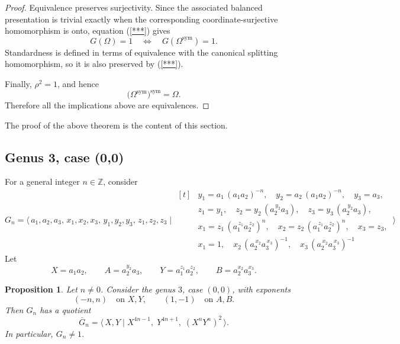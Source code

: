 \documentclass{article}
\newtheorem{prop}[theorem]{Proposition}
\newcommand{\Z}{\mathbb{Z}}
\newcommand{\gp}[2]{\langle\, #1 \mid #2 \,\rangle}
\begin{document}
\begin{proof}
Equivalence preserves surjectivity.  Since the associated balanced
presentation is trivial exactly when the corresponding
coordinate-surjective homomorphism is onto, equation (\ref{***}) gives
\[
   G(\Omega)=1
   \quad\Longleftrightarrow\quad
   G(\Omega^{\mathrm{sym}})=1.
\]
Standardness is defined in terms of equivalence with the canonical
splitting homomorphism, so it is also preserved by (\ref{***}).

Finally, \(\rho^2=1\), and hence
\[
   \bigl(\Omega^{\mathrm{sym}}\bigr)^{\mathrm{sym}}
   =
   \Omega.
\]
Therefore all the implications above are equivalences.
\end{proof}

The proof of the above  theorem is the content of this section.


\subsection{Genus 3, case (0,0)}
For a general integer $n\in\Z$, consider
\[
G_n=\gp{a_1,a_2,a_3,\,x_1,x_2,x_3,\,y_1,y_2,y_3,\,z_1,z_2,z_3}{
\begin{aligned}[t]
&y_1=a_1\,(a_1a_2)^{-n},\quad y_2=a_2\,(a_1a_2)^{-n},\quad y_3=a_3,\\
&z_1=y_1,\quad z_2=y_2\,(a_2^{\,y_2}a_3),\quad z_3=y_3\,(a_2^{\,y_2}a_3),\\
&x_1=z_1\,(a_1^{\,z_1}a_2^{\,z_2})^{n},\quad x_2=z_2\,(a_1^{\,z_1}a_2^{\,z_2})^{n},\quad x_3=z_3,\\
&x_1=1,\quad x_2\,(a_2^{\,x_2}a_3^{\,x_3})^{-1},\quad x_3\,(a_2^{\,x_2}a_3^{\,x_3})^{-1}
\end{aligned}
}
\]
Let
\[
X=a_1a_2,\qquad
 A=a_2^{y_2}a_3,\qquad
Y=a_1^{z_1}a_2^{z_2},\qquad
B=a_2^{x_2}a_3^{x_3}.
\]

\begin{prop}\label{lm:genus3-00-quotient}
Let \(n\neq 0\).  Consider the genus \(3\), case \((0,0)\), with
exponents
\[
(-n,n)\quad\text{on }X,Y,
\qquad
(1,-1)\quad\text{on }A,B.
\]
Then $G_n$ has a quotient \[
\overline G_n=
\gp{X,Y}{
X^{4n-1},\;
Y^{4n+1},\;
(X^nY^n)^2
}.
\]
In particular, \(G_n\neq 1\).
\end{prop}
\end{document}
